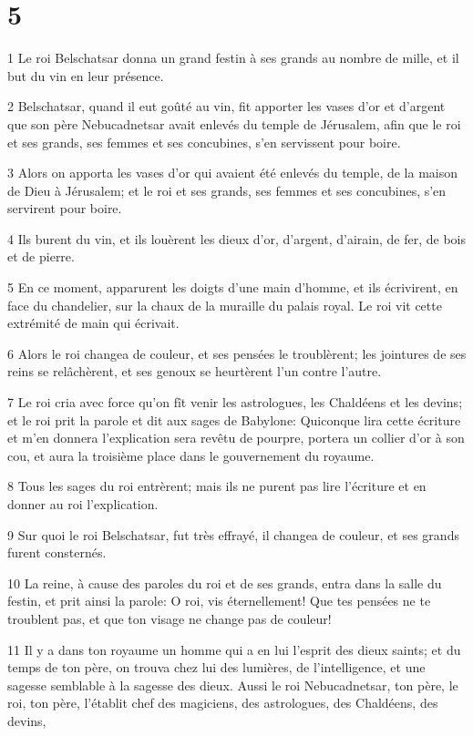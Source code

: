 \chapter{5}

\par 1 Le roi Belschatsar donna un grand festin à ses grands au nombre de mille, et il but du vin en leur présence.
\par 2 Belschatsar, quand il eut goûté au vin, fit apporter les vases d'or et d'argent que son père Nebucadnetsar avait enlevés du temple de Jérusalem, afin que le roi et ses grands, ses femmes et ses concubines, s'en servissent pour boire.
\par 3 Alors on apporta les vases d'or qui avaient été enlevés du temple, de la maison de Dieu à Jérusalem; et le roi et ses grands, ses femmes et ses concubines, s'en servirent pour boire.
\par 4 Ils burent du vin, et ils louèrent les dieux d'or, d'argent, d'airain, de fer, de bois et de pierre.
\par 5 En ce moment, apparurent les doigts d'une main d'homme, et ils écrivirent, en face du chandelier, sur la chaux de la muraille du palais royal. Le roi vit cette extrémité de main qui écrivait.
\par 6 Alors le roi changea de couleur, et ses pensées le troublèrent; les jointures de ses reins se relâchèrent, et ses genoux se heurtèrent l'un contre l'autre.
\par 7 Le roi cria avec force qu'on fît venir les astrologues, les Chaldéens et les devins; et le roi prit la parole et dit aux sages de Babylone: Quiconque lira cette écriture et m'en donnera l'explication sera revêtu de pourpre, portera un collier d'or à son cou, et aura la troisième place dans le gouvernement du royaume.
\par 8 Tous les sages du roi entrèrent; mais ils ne purent pas lire l'écriture et en donner au roi l'explication.
\par 9 Sur quoi le roi Belschatsar, fut très effrayé, il changea de couleur, et ses grands furent consternés.
\par 10 La reine, à cause des paroles du roi et de ses grands, entra dans la salle du festin, et prit ainsi la parole: O roi, vis éternellement! Que tes pensées ne te troublent pas, et que ton visage ne change pas de couleur!
\par 11 Il y a dans ton royaume un homme qui a en lui l'esprit des dieux saints; et du temps de ton père, on trouva chez lui des lumières, de l'intelligence, et une sagesse semblable à la sagesse des dieux. Aussi le roi Nebucadnetsar, ton père, le roi, ton père, l'établit chef des magiciens, des astrologues, des Chaldéens, des devins,
